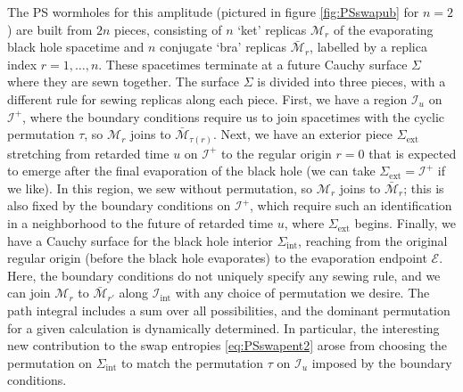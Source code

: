 \documentclass[letterpaper,12pt]{article}
\newcommand*{\scri}{\mathscr{I}} %
\newcommand*{\evap}{\mathscr{E}} %
\begin{document}
The PS wormholes for this amplitude (pictured in figure \ref{fig:PSswapub} for $n=2$) are built from $2n$ pieces, consisting of $n$ `ket' replicas $\mathcal{M}_r$ of the evaporating black hole spacetime and $n$ conjugate `bra' replicas $\bar{\mathcal{M}}_r$, labelled by a replica index $r=1,\ldots,n$. These spacetimes terminate at a future Cauchy surface $\Sigma$ where they are sewn together. The surface $\Sigma$ is divided into three pieces, with a different rule for sewing replicas along each piece. First, we have a region $\scri_u$ on $\scri^+$, where the boundary conditions require us to join spacetimes with the cyclic permutation $\tau$, so $\mathcal{M}_r$ joins to $\bar{\mathcal{M}}_{\tau(r)}$. Next, we have an exterior piece $\Sigma_{\mathrm{ext}}$ stretching from retarded time $u$ on $\scri^+$ to the regular origin $r=0$ that is expected to emerge after the final evaporation of the black hole (we can take $\Sigma_{\mathrm{ext}}=\scri^+$ if we like). In this region, we sew without permutation, so $\mathcal{M}_r$ joins to $\bar{\mathcal{M}}_r$; this is also fixed by the boundary conditions on $\scri^+$, which require such an identification in a neighborhood to the future of retarded time $u$, where $\Sigma_\mathrm{ext}$ begins. Finally, we have a Cauchy surface for the black hole interior $\Sigma_{\mathrm{int}}$, reaching from the original regular origin (before the black hole evaporates) to the evaporation endpoint $\evap$. Here, the boundary conditions do not uniquely specify any sewing rule, and we can join $\mathcal{M}_r$ to $\bar{\mathcal{M}}_{r'}$ along $\scri_\mathrm{int}$ with any choice of permutation we desire. The path integral includes a sum over all possibilities, and the dominant permutation for a given calculation is dynamically determined. In particular, the interesting new contribution to the swap entropies \eqref{eq:PSswapent2} arose from choosing the permutation on $\Sigma_\mathrm{int}$ to match the permutation $\tau$ on $\scri_u$ imposed by the boundary conditions.
\end{document}
